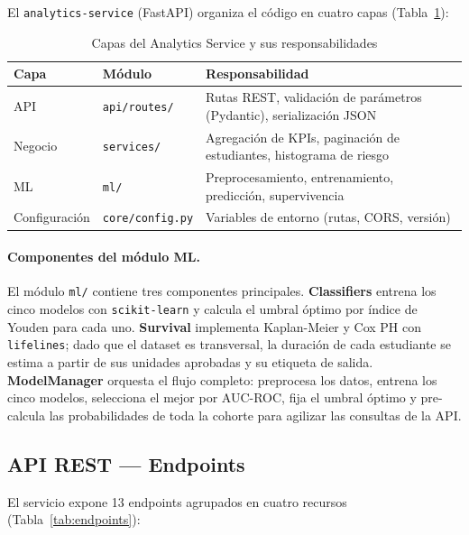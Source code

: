 \documentclass[12pt]{article}
\begin{document}
{El \texttt{analytics-service} (FastAPI) organiza el código en cuatro capas
(Tabla~\ref{tab:capas_backend}):

\begin{table}[H]
\centering
\caption{Capas del Analytics Service y sus responsabilidades}
\label{tab:capas_backend}
\begin{tabular}{p{3cm}p{3.5cm}p{7cm}}
\toprule
\textbf{Capa} & \textbf{Módulo} & \textbf{Responsabilidad} \\
\midrule
API & \texttt{api/routes/} & Rutas REST, validación de parámetros (Pydantic), serialización JSON \\
Negocio & \texttt{services/} & Agregación de KPIs, paginación de estudiantes, histograma de riesgo \\
ML & \texttt{ml/} & Preprocesamiento, entrenamiento, predicción, supervivencia \\
Configuración & \texttt{core/config.py} & Variables de entorno (rutas, CORS, versión) \\
\bottomrule
\end{tabular}
\end{table}

\paragraph{Componentes del módulo ML.}
El módulo \texttt{ml/} contiene tres componentes principales. \textbf{Classifiers}
entrena los cinco modelos con \texttt{scikit-learn} y calcula el umbral óptimo por
índice de Youden para cada uno. \textbf{Survival} implementa Kaplan-Meier y Cox PH
con \texttt{lifelines}; dado que el dataset es transversal, la duración de cada
estudiante se estima a partir de sus unidades aprobadas y su etiqueta de salida.
\textbf{ModelManager} orquesta el flujo completo: preprocesa los datos, entrena los
cinco modelos, selecciona el mejor por AUC-ROC, fija el umbral óptimo y pre-calcula
las probabilidades de toda la cohorte para agilizar las consultas de la API.

\subsection{API REST — Endpoints}

El servicio expone 13 endpoints agrupados en cuatro recursos (Tabla~\ref{tab:endpoints}):

}
\end{document}
